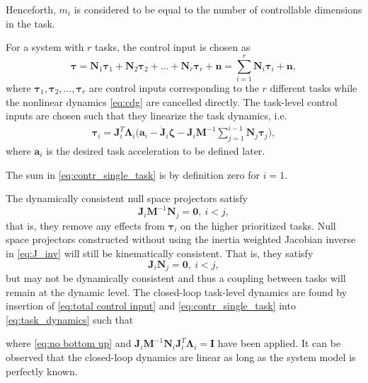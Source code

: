 \documentclass[../main.tex]{subfiles}
\begin{document}
\begin{remark}
    Henceforth, $m_i$ is considered to be equal to the number of controllable dimensions in the task.
\end{remark}
For a system with $r$ tasks, the control input is chosen as
\begin{equation}
    \label{eq:total control input}
    \bm{\tau} = \bm{N}_1\bm{\tau}_1 + \bm{N}_2 \bm{\tau}_2 + ... + \bm{N}_r \bm{\tau}_r + \bm{n} = \sum_{i=1}^r \bm{N}_i\bm{\tau}_i + \bm{n},
\end{equation}
where $\bm{\tau}_1, \bm{\tau}_2,...,\bm{\tau}_r$ are control inputs corresponding to the $r$ different tasks while the nonlinear dynamics \eqref{eq:cdg} are cancelled directly. The task-level control inputs are chosen such that they linearize the task dynamics, i.e.
\begin{align}
\label{eq:contr_single_task}
\bm{\tau}_i =
    \bm{J}_i^T\bm{\Lambda}_i\bigg(\bm{a}_i - \dot{\bm{J}}_i\bm{\zeta} - \bm{J}_i \bm{M}^{-1}\sum_{j=1}^{i-1}\bm{N}_j \bm{\tau}_j\bigg),
\end{align}
where $\bm{a}_i$ is the desired task acceleration to be defined later.
\begin{remark}
    The sum in \eqref{eq:contr_single_task} is by definition zero for $i=1$.
\end{remark}
The dynamically consistent null space projectors satisfy
\begin{equation}
    \label{eq:no bottom up}
    \bm{J}_i \bm{M}^{-1} \bm{N}_j = \bm{0}, \ i<j,
\end{equation}
that is, they remove any effects from $\bm{\tau}_i$ on the higher prioritized tasks. Null space projectors constructed without using the inertia weighted Jacobian inverse in \eqref{eq:J_inv} will still be kinematically consistent. That is, they satisfy
\begin{equation}
    \label{eq:kinematic_consistency}
    \bm{J}_i \bm{N}_j = \bm{0}, \ i<j,
\end{equation}
but may not be dynamically consistent and thus a coupling between tasks will remain at the dynamic level. The closed-loop task-level dynamics are found by insertion of \eqref{eq:total control input} and \eqref{eq:contr_single_task} into \eqref{eq:task_dynamics} such that
where \eqref{eq:no bottom up} and $\bm{J}_i\bm{M}^{-1}\bm{N}_i\bm{J}_i^T\bm{\Lambda}_i = \bm{I}$ have been applied. It can be observed that the closed-loop dynamics are linear as long as the system model is perfectly known.
\end{document}
